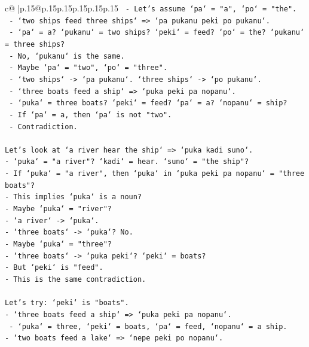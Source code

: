 \documentclass{article}
\begin{document}
{\begin{supertabular}{c@{$\;$}|p{.15\linewidth}@{}p{.15\linewidth}p{.15\linewidth}p{.15\linewidth}p{.15\linewidth}p{.15\linewidth}}
{{{\texttt{  {-} Let's assume `pa` = "a", `po` = "the".} \\
\texttt{  {-} `two ships feed three ships` => `pa pukanu peki po pukanu`.} \\
\texttt{    {-} `pa` = a? `pukanu` = two ships? `peki` = feed? `po` = the? `pukanu` = three ships?} \\
\texttt{    {-} No, `pukanu` is the same.} \\
\texttt{  {-} Maybe `pa` = "two", `po` = "three".} \\
\texttt{  {-} `two ships` {-}> `pa pukanu`. `three ships` {-}> `po pukanu`.} \\
\texttt{  {-} `three boats feed a ship` => `puka peki pa nopanu`.} \\
\texttt{    {-} `puka` = three boats? `peki` = feed? `pa` = a? `nopanu` = ship?} \\
\texttt{    {-} If `pa` = a, then `pa` is not "two".} \\
\texttt{    {-} Contradiction.} \\
\\ 
\texttt{Let's look at `a river hear the ship` => `puka kadi suno`.} \\
\texttt{{-} `puka` = "a river"? `kadi` = hear. `suno` = "the ship"?} \\
\texttt{{-} If `puka` = "a river", then `puka` in `puka peki pa nopanu` = "three boats"?} \\
\texttt{{-} This implies `puka` is a noun?} \\
\texttt{{-} Maybe `puka` = "river"?} \\
\texttt{{-} `a river` {-}> `puka`.} \\
\texttt{{-} `three boats` {-}> `puka`? No.} \\
\texttt{{-} Maybe `puka` = "three"?} \\
\texttt{{-} `three boats` {-}> `puka peki`? `peki` = boats?} \\
\texttt{{-} But `peki` is "feed".} \\
\texttt{{-} This is the same contradiction.} \\
\\ 
\texttt{Let's try: `peki` is "boats".} \\
\texttt{{-} `three boats feed a ship` => `puka peki pa nopanu`.} \\
\texttt{  {-} `puka` = three, `peki` = boats, `pa` = feed, `nopanu` = a ship.} \\
\texttt{{-} `two boats feed a lake` => `nepe peki po nopanu`.} \\
}}}
\end{supertabular}}
\end{document}
